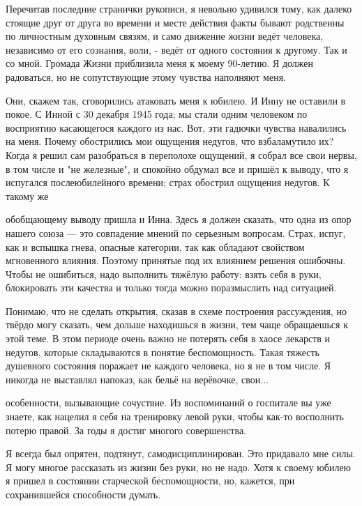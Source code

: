 \label{263-1}
Перечитав последние странички рукописи, я невольно удивился тому, как далеко стоящие друг от друга во времени и месте действия факты бывают родственны по личностным духовным связям, и само движение жизни ведёт человека, независимо от его сознания, воли, - ведёт от одного состояния к другому. Так и со мной. Громада Жизни приблизила меня к моему 90-летию. Я должен радоваться, но не сопутствующие этому чувства наполняют меня.

\label{264-1}
Они, скажем так, сговорились атаковать меня к юбилею. И Инну не оставили в покое. С Инной с 30 декабря 1945 года; мы стали одним человеком по восприятию касающегося каждого из нас. Вот, эти гадючки чувства навалились на меня. Почему обострились мои ощущения недугов, что взбаламутило их? Когда я решил сам разобраться в переполохе  ощущений, я собрал все свои нервы, в том числе и "не железные", и спокойно обдумал все и пришёл к выводу, что я испугался послеюбилейного времени; страх обострил ощущения недугов. К такому же

\label{265-1}
обобщающему выводу пришла и Инна. Здесь я должен сказать, что одна из опор нашего союза — это совпадение мнений по серьезным вопросам. Страх, испуг, как и вспышка гнева, опасные категории, так как обладают свойством мгновенного влияния. Поэтому принятые под их влиянием решения ошибочны. Чтобы не ошибиться, надо выполнить тяжёлую работу: взять себя в руки, блокировать эти качества и только тогда можно поразмыслить над ситуацией.

\label{266-1}
Понимаю, что не сделать открытия, сказав в схеме построения рассуждения, но твёрдо могу сказать, чем дольше находишься в жизни, тем чаще обращаешься к этой теме. В этом периоде очень важно не потерять себя в хаосе лекарств и недугов, которые складываются в понятие беспомощность. Такая тяжесть душевного состояния поражает не каждого человека, но я не в том числе. Я никогда не выставлял напоказ, как бельё на верёвочке, свои...

\label{267-1}
особенности, вызывающие сочуствие.
Из воспоминаний о госпитале вы уже знаете, как нацелил я себя на тренировку левой руки, чтобы как-то восполнить потерю правой. За годы я достиг многого совершенства.

Я всегда был опрятен, подтянут, самодисциплинирован. Это придавало мне силы. Я могу многое рассказать из жизни без руки, но не надо. Хотя к своему юбилею я пришел в состоянии старческой беспомощности, но, кажется, при сохранившейся способности думать.